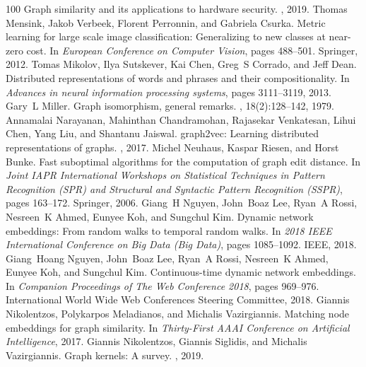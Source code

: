 \begin{thebibliography}{100}
\newblock Graph similarity and its applications to hardware security.
, 2019.
Thomas Mensink, Jakob Verbeek, Florent Perronnin, and Gabriela Csurka.
\newblock Metric learning for large scale image classification: Generalizing to
  new classes at near-zero cost.
\newblock In {\em European Conference on Computer Vision}, pages 488--501.
  Springer, 2012.
Tomas Mikolov, Ilya Sutskever, Kai Chen, Greg~S Corrado, and Jeff Dean.
\newblock Distributed representations of words and phrases and their
  compositionality.
\newblock In {\em Advances in neural information processing systems}, pages
  3111--3119, 2013.
Gary~L Miller.
\newblock Graph isomorphism, general remarks.
, 18(2):128--142, 1979.
Annamalai Narayanan, Mahinthan Chandramohan, Rajasekar Venkatesan, Lihui Chen,
  Yang Liu, and Shantanu Jaiswal.
\newblock graph2vec: Learning distributed representations of graphs.
, 2017.
Michel Neuhaus, Kaspar Riesen, and Horst Bunke.
\newblock Fast suboptimal algorithms for the computation of graph edit
  distance.
\newblock In {\em Joint IAPR International Workshops on Statistical Techniques
  in Pattern Recognition (SPR) and Structural and Syntactic Pattern Recognition
  (SSPR)}, pages 163--172. Springer, 2006.
Giang~H Nguyen, John~Boaz Lee, Ryan~A Rossi, Nesreen~K Ahmed, Eunyee Koh, and
  Sungchul Kim.
\newblock Dynamic network embeddings: From random walks to temporal random
  walks.
\newblock In {\em 2018 IEEE International Conference on Big Data (Big Data)},
  pages 1085--1092. IEEE, 2018.
Giang~Hoang Nguyen, John~Boaz Lee, Ryan~A Rossi, Nesreen~K Ahmed, Eunyee Koh,
  and Sungchul Kim.
\newblock Continuous-time dynamic network embeddings.
\newblock In {\em Companion Proceedings of The Web Conference 2018}, pages
  969--976. International World Wide Web Conferences Steering Committee, 2018.
Giannis Nikolentzos, Polykarpos Meladianos, and Michalis Vazirgiannis.
\newblock Matching node embeddings for graph similarity.
\newblock In {\em Thirty-First AAAI Conference on Artificial Intelligence},
  2017.
Giannis Nikolentzos, Giannis Siglidis, and Michalis Vazirgiannis.
\newblock Graph kernels: A survey.
, 2019.

\end{thebibliography}
